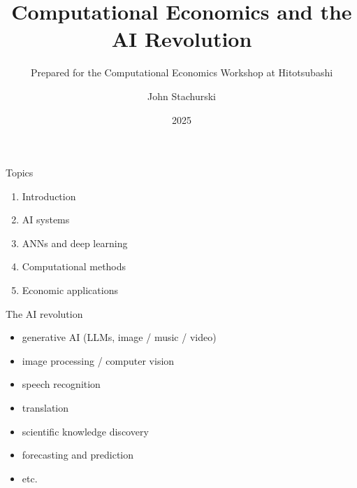 


\title{Computational Economics and the AI Revolution}
\subtitle{Prepared for the Computational Economics Workshop at Hitotsubashi}


\author{John Stachurski}


\date{2025}




\begin{frame}
  \titlepage
\end{frame}



\begin{frame}{Topics}

    \begin{enumerate}
        \item Introduction
        \vspace{0.5em}
        \item AI systems
        \vspace{0.5em}
        \item ANNs and deep learning
        \vspace{0.5em}
        \item Computational methods
        \vspace{0.5em}
        \item Economic applications
    \end{enumerate}

\end{frame}



\begin{frame}{The AI revolution}


    \begin{itemize}
        \item generative AI  (LLMs, image / music / video)
        \vspace{0.5em}
        \item image processing / computer vision
        \vspace{0.5em}
        \item speech recognition
        \vspace{0.5em}
        \item translation
        \vspace{0.5em}
        \item scientific knowledge discovery
        \vspace{0.5em}
        \item forecasting and prediction 
        \vspace{0.5em}
        \item etc.
    \end{itemize}

    
\end{frame}

